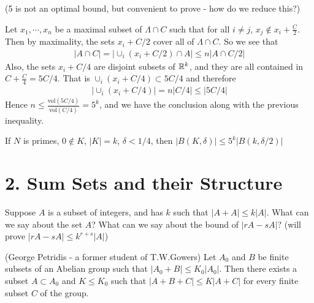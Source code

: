 \documentclass[12pt,a4paper]{report}
\newenvironment{proof}
{\begin{changemargin}{1cm}{0.5cm}
	}%
	{\end{changemargin}
}
\begin{document}
(5 is not an optimal bound, but convenient to prove - how do we reduce this?)
\begin{proof}
\pf Let $x_1, \cdots, x_n$ be a maximal subset of $\Lambda \cap C$ such that for all $i \neq j$, $x_j \notin x_i + \frac{C}{2}$. Then by maximality, the sets $x_i + C/2$ cover all of $\Lambda \cap C$. So we see that
\begin{align*}
|A \cap C|  = \big| \cup_i (x_i + C/2) \cap A \big| \leq n \big|A \cap C/2 \big|
\end{align*}
Also, the sets $x_i + C/4$ are disjoint subsets of $\mathbb{R}^k$, and they are all contained in $C + \frac{C}{4} = 5C/4$. That is $\cup_i (x_i + C/4) \subset 5C/4$ and therefore
\begin{align*}
\big| \cup_i (x_i + C/4) \big| = n \big| C/4 \big| \leq \big| 5C/4 \big|
\end{align*}
Hence $n \leq \frac{\text{vol}(5C/4)}{\text{vol}(C/4)} = 5^k$, and we have the conclusion along with the previous inequality.
\end{proof}
\s

 If $N$ is primes, $0\notin K$, $|K| =k$, $\delta <1/4$, then $|B(K,\delta)| \leq 5^k |B(k,\delta/2)|$
\s

\section*{2. Sum Sets and their Structure}

Suppose $A$ is a subset of integers, and has $k$ such that $|A+A | \leq k|A|$. What can we say about the set $A$? What can we say about the bound of $|rA-sA|$? (will prove $|rA-sA| \leq k^{r+s}|A|$)
\s

 (George Petridis - a former student of T.W.Gowers) Let $A_0$ and $B$ be finite subsets of an Abelian group such that $|A_0 + B | \leq K_0 |A_0| $. Then there exists a subset $A\subset A_0$ and $K\leq K_0$ such that $|A+B+C|\leq K|A+C|$ for every finite subset $C$ of the group.
\s
\end{document}
